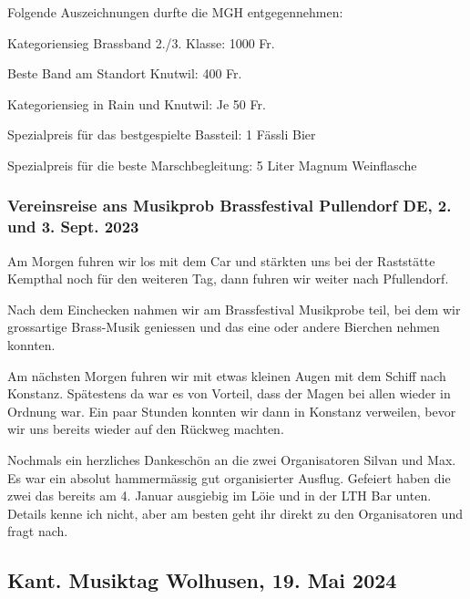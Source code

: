 \begin{history}
    \noindent Folgende Auszeichnungen durfte die MGH entgegennehmen:

    Kategoriensieg Brassband 2./3. Klasse: 1000 Fr.

    Beste Band am Standort Knutwil: 400 Fr.

    Kategoriensieg in Rain und Knutwil: Je 50 Fr.

    Spezialpreis für das bestgespielte Bassteil: 1 Fässli Bier

    Spezialpreis für die beste Marschbegleitung: 5 Liter Magnum Weinflasche


    \subsubsection*{Vereinsreise ans Musikprob Brassfestival Pullendorf DE, 2. und 3. Sept. 2023}

    Am Morgen fuhren wir los mit dem Car und stärkten uns bei der Raststätte
    Kempthal noch für den weiteren Tag, dann fuhren wir weiter nach Pfullendorf.

    Nach dem Einchecken nahmen wir am Brassfestival Musikprobe teil, bei dem wir
    grossartige Brass-Musik geniessen und das eine oder andere Bierchen nehmen
    konnten.

    Am nächsten Morgen fuhren wir mit etwas kleinen Augen mit dem Schiff nach
    Konstanz. Spätestens da war es von Vorteil, dass der Magen bei allen wieder
    in Ordnung war. Ein paar Stunden konnten wir dann in Konstanz verweilen,
    bevor wir uns bereits wieder auf den Rückweg machten.

    Nochmals ein herzliches Dankeschön an die zwei Organisatoren Silvan und Max.
    Es war ein absolut hammermässig gut organisierter Ausflug. Gefeiert haben
    die zwei das bereits am 4. Januar ausgiebig im Löie und in der LTH Bar
    unten. Details kenne ich nicht, aber am besten geht ihr direkt zu den
    Organisatoren und fragt nach.

\end{history}

\subsection*{Kant. Musiktag Wolhusen, 19. Mai 2024}

